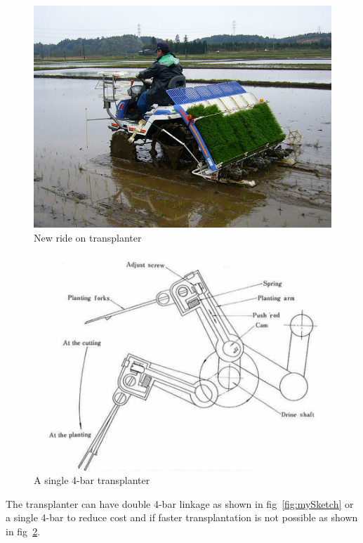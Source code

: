 \documentclass[a4paper,latin,center,onecolumn]{paper}
\begin{document}
            \begin{figure}[hbt!]
                \centering
                \includegraphics[width=0.9\columnwidth]{Images/ride_on_transplanter_new.png}
                \caption{New ride on transplanter}
                \label{fig:rideOnTransplanter}
            \end{figure}

            \begin{figure}[hbt!]
                \centering
                \includegraphics[width=0.9\columnwidth]{Images/seedling_cutting_by_planting_fork.png}
                \caption{A single 4-bar transplanter}
                \label{fig:4barTransplanter}
            \end{figure}

            The transplanter can have double 4-bar linkage as shown in fig~\ref{fig:mySketch} or a single 4-bar to reduce cost and if faster transplantation is not possible as shown in fig~\ref{fig:4barTransplanter}.
\end{document}
